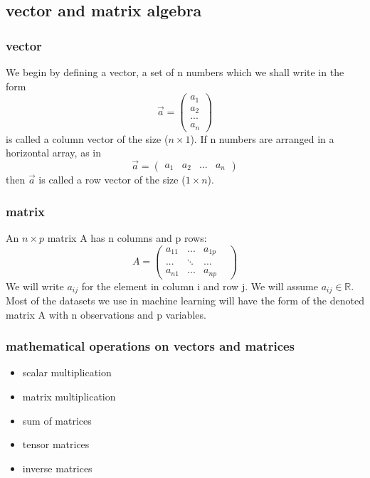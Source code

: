 \documentclass{beamer}
\begin{document}
\subsection{vector and matrix algebra} %

\begin{frame}
\frametitle{vector}
We begin by defining a vector, a set of n numbers which we shall write in the form
$$
\vec{a} = 
\begin{pmatrix}
a_{1}\\
a_{2} \\
...\\
a_{n}
\end{pmatrix}
$$
is called a column vector of the size ($n \times 1$).
\newline
If n numbers are arranged in a horizontal array, as in
$$
\vec{a} = 
\begin{pmatrix}
a_{1} &
a_{2} &
... &
a_{n}
\end{pmatrix}
$$
then $\vec{a}$ is called a row vector of the size ($1 \times n$).

\end{frame}

\begin{frame}
\frametitle{matrix}
An $n \times p$ matrix A has n columns and p rows: 
$$
A = 
\begin{pmatrix} 
a_{11} & ... & a_{1p} \\
... & \ddots &...\\
a_{n1} & ... & a_{np} & 
\end{pmatrix}
$$
We will write $a_{ij}$ for the element in column i and row j.
\newline
We will assume $a_{ij} \in \mathbb{R}$. 
\newline
\newline
Most of the datasets we use in machine learning will have the form of the denoted matrix A with n observations and p variables.


\end{frame}


\begin{frame}
\frametitle{mathematical operations on vectors and matrices}

\begin{itemize}
\item scalar multiplication
\item matrix multiplication
\item sum of matrices
\item tensor matrices
\item inverse matrices
\end{itemize}

\end{frame}
\end{document}
